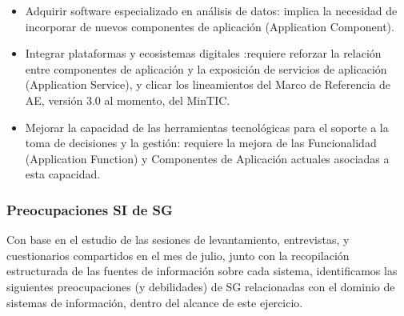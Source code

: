 \documentclass[
	a4paper, %
	12pt, %
]{include/CSSullivanBusinessReport}
\def\tightlist{}
\begin{document}
\begin{itemize}
\tightlist
\item
  Adquirir software especializado en análisis de datos: implica la
  necesidad de incorporar de nuevos componentes de aplicación
  (Application Component).
\item
  Integrar plataformas y ecosistemas digitales :requiere reforzar la
  relación entre componentes de aplicación y la exposición de servicios
  de aplicación (Application Service), y clicar los lineamientos del
  Marco de Referencia de AE, versión 3.0 al momento, del MinTIC.
\item
  Mejorar la capacidad de las herramientas tecnológicas para el soporte
  a la toma de decisiones y la gestión: requiere la mejora de las
  Funcionalidad (Application Function) y Componentes de Aplicación
  actuales asociadas a esta capacidad.
\end{itemize}

\subsubsection{Preocupaciones SI de
SG}\label{sec:preocupaciones-si-de-sg}

Con base en el estudio de las sesiones de levantamiento, entrevistas, y
cuestionarios compartidos en el mes de julio, junto con la recopilación
estructurada de las fuentes de información sobre cada sistema,
identificamos las siguientes preocupaciones (y debilidades) de SG
relacionadas con el dominio de sistemas de información, dentro del
alcance de este ejercicio.
\end{document}
